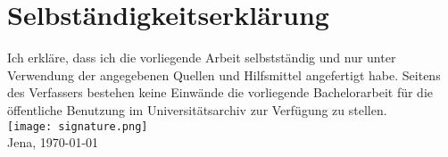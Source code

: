 \chapter{Selbständigkeitserklärung}
Ich erkläre, dass ich die vorliegende Arbeit selbstständig und nur unter Verwendung der angegebenen Quellen und Hilfsmittel angefertigt habe.
Seitens des Verfassers bestehen keine Einwände die vorliegende Bachelorarbeit für die öffentliche Benutzung im Universitätsarchiv zur Verfügung zu stellen.
\vspace{3mm}\\
\texttt{[image: signature.png]}
\vspace{3mm}\\
Jena, \today